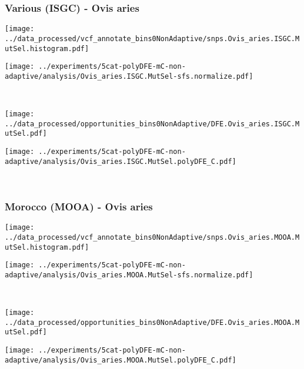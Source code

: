 \subsubsection{Various (ISGC) - Ovis aries}

\begin{minipage}{0.49\linewidth}
    \texttt{[image: ../data\_processed/vcf\_annotate\_bins0NonAdaptive/snps.Ovis\_aries.ISGC.MutSel.histogram.pdf]}
\end{minipage}
\begin{minipage}{0.49\linewidth}
    \texttt{[image: ../experiments/5cat-polyDFE-mC-non-adaptive/analysis/Ovis\_aries.ISGC.MutSel-sfs.normalize.pdf]}
\end{minipage}
\\
\begin{minipage}{0.49\linewidth}
    \texttt{[image: ../data\_processed/opportunities\_bins0NonAdaptive/DFE.Ovis\_aries.ISGC.MutSel.pdf]}
\end{minipage}
\begin{minipage}{0.49\linewidth}
    \texttt{[image: ../experiments/5cat-polyDFE-mC-non-adaptive/analysis/Ovis\_aries.ISGC.MutSel.polyDFE\_C.pdf]}
\end{minipage}
\\

\subsubsection{Morocco (MOOA) - Ovis aries}

\begin{minipage}{0.49\linewidth}
    \texttt{[image: ../data\_processed/vcf\_annotate\_bins0NonAdaptive/snps.Ovis\_aries.MOOA.MutSel.histogram.pdf]}
\end{minipage}
\begin{minipage}{0.49\linewidth}
    \texttt{[image: ../experiments/5cat-polyDFE-mC-non-adaptive/analysis/Ovis\_aries.MOOA.MutSel-sfs.normalize.pdf]}
\end{minipage}
\\
\begin{minipage}{0.49\linewidth}
    \texttt{[image: ../data\_processed/opportunities\_bins0NonAdaptive/DFE.Ovis\_aries.MOOA.MutSel.pdf]}
\end{minipage}
\begin{minipage}{0.49\linewidth}
    \texttt{[image: ../experiments/5cat-polyDFE-mC-non-adaptive/analysis/Ovis\_aries.MOOA.MutSel.polyDFE\_C.pdf]}
\end{minipage}
\\
